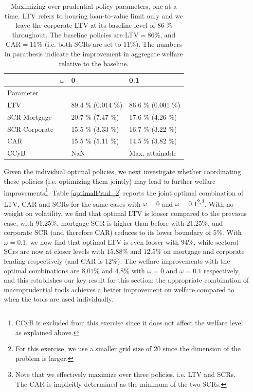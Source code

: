 \documentclass[12pt]{article}
\numberwithin{equation}{section}
\begin{document}
\begin{table}[h]

\caption{Maximizing over prudential policy parameters, one at a time. LTV refers to housing loan-to-value limit only and we leave the corporate LTV at its baseline level of 86 \% throughout. The baseline policies are LTV$=86\%$, and CAR$=11 \% $ (i.e. both SCRs are set to $11 \%$). The numbers in parathesis indicate the improvement in aggregate welfare relative to the baseline.}
\label{optimalPrud_1}
\begin{tabular}{l|l|l|l}

 & $\omega$ & 0 & 0.1   \\
 \hline
 \hline
Parameter & & &  \\
\hline
\hline
LTV &  & 89.4 \% (0.014 \%) & 86.6 \% (0.001 \%)  \\

SCR-Mortgage &  & 20.7 \% (7.47 \%) & 17.6 \% (4.26 \%) \\

SCR-Corporate & & 15.5 \% (3.33 \%) & 16.7 \% (3.22 \%) \\

CAR & & 15.5 \% (5.11 \%) & 14.5 \% (3.82 \%) \\

CCyB & & NaN & Max. attainable \\

\end{tabular}
\end{table}


Given the individual optimal policies, we next investigate whether coordinating these policies (i.e. optimizing them jointly) may lead to further welfare improvements\footnote{CCyB is excluded from this exercise since it does not affect the welfare level as explained above.}. Table \ref{optimalPrud_2} reports the joint optimal combination of LTV, CAR and SCRs for the same cases with $\omega=0$ and $\omega=0.1$\footnote{For this exercise, we use a smaller grid size of 20 since the dimension of the problem is larger.}$^{,}$\footnote{Note that we effectively maximize over three policies, i.e. LTV and SCRs. The CAR is implicitly determined as the minimum of the two SCRs. }. With no weight on volatility, we find that optimal LTV is  looser compared to the previous case, with $91.25 \%$, mortgage SCR is higher than before with $21.25 \%$, and corporate SCR (and therefore CAR) reduces to its lower boundary of $5 \%$. With $\omega=0.1$, we now find that optimal LTV is even looser with $ 94 \%$, while sectoral SCrs are now at closer levels with $15.88 \%$ and $12.5 \%$ on mortgage and corporate lending respectively (and CAR is 12\%). The welfare improvements with the optimal combinations are $8.01 \%$ and $4.8 \%$ with $\omega=0$ and $\omega=0.1$ respectively, and this establishes our key result for this section: the appropriate combination of macroprudential tools achieves a better improvement on welfare compared to when the tools are used individually. 
\end{document}
